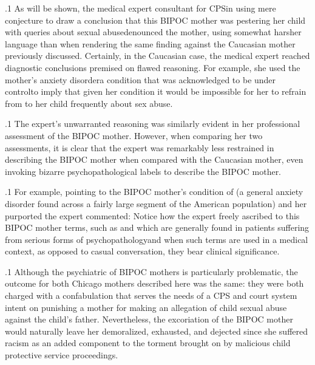 \documentclass[11pt, twoside]{article}
\begin{document}
{\p.1{%
\noindent{}As will be shown, the medical expert consultant for CPS\mdash{}in using mere
conjecture to draw a conclusion that this BIPOC mother was pestering
her child with queries about sexual abuse\mdash{}denounced the mother, using somewhat harsher language than when rendering the same  finding against the Caucasian mother previously discussed.
Certainly, in the Caucasian case, the medical expert reached diagnostic conclusions premised on flawed reasoning. For example, she used
the mother's anxiety disorder\mdash{}a condition that was acknowledged to
be under control\mdash{}to imply that given her condition it would be impossible for her to refrain from  to her child frequently about sex
abuse.
}%

\p.1{%
The expert's unwarranted reasoning was similarly evident in her professional assessment of the BIPOC mother. However, when comparing
her two assessments, it is clear that the expert was remarkably less restrained in describing the BIPOC mother when compared with the
Caucasian mother, even invoking bizarre psychopathological labels to
describe the BIPOC mother.
}%

\p.1{%
For example, pointing to the BIPOC mother's condition of  (a general anxiety disorder found across a fairly large segment
of the American population) and her purported  the expert commented:  Notice how the expert freely ascribed to this BIPOC mother terms, such as  and 
which are generally found in patients suffering from serious forms of
psychopathology\mdash{}and when such terms are used in a medical context, as opposed to casual conversation, they bear clinical significance.
}%

\p.1{%
Although the psychiatric  of BIPOC mothers is particularly
problematic, the outcome for both Chicago mothers described here
was the same: they were both charged with \mdash{}a
confabulation that serves the needs of a CPS and court system intent
on punishing a mother for making an allegation of child sexual abuse
against the child's father. Nevertheless, the excoriation of the BIPOC
mother would naturally leave her demoralized, exhausted, and dejected
since she suffered racism as an added component to the torment
brought on by malicious child protective service proceedings.
}%





}
\end{document}
